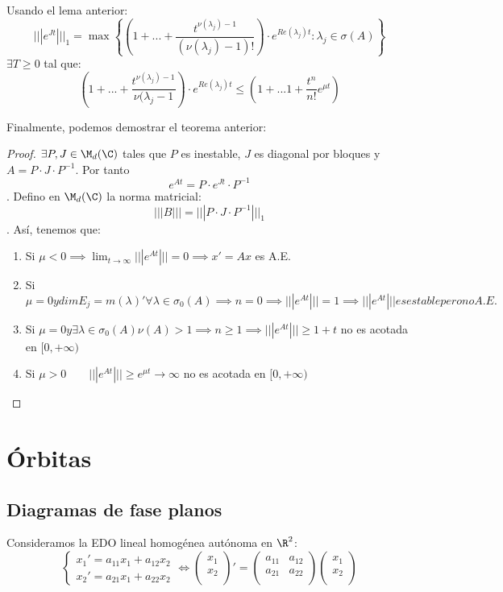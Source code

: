 Usando el lema anterior:
\begin{equation}
|||e^{Jt}|||_1=\max
\left\{ {\left(
1+...+\frac{t^{\nu(\lambda_j)-1}}{(\nu (\lambda_j)-1)!}
\right) }
\cdot e^{Re(\lambda_j)t} : \lambda_j \in \sigma(A) \right\}
\tag{cosarara}\label{cosarara}
\end{equation}
$\exists T \geq 0$ tal que:
\begin{equation}
(1+...+\frac{t^{\nu(\lambda_j)-1}}{\nu(\lambda_j - 1})\cdot e^{Re(\lambda_j)t} \leq (1+...1+\frac{t^n}{n!}e^{\mu t})
\end{equation}

Finalmente, podemos demostrar el teorema anterior:

\begin{proof}
$\exists P, J \in \M_d(\C)$ tales que $P$ es inestable, $J$ es diagonal por bloques y $A=P\cdot J \cdot P^{-1}$. Por tanto $$e^{At}=P\cdot e^{Jt} \cdot P^{-1}$$.
Defino en $\M_d(\C)$ la norma matricial:
$$|||B|||=|||P\cdot J \cdot P^{-1}|||_1$$.
Así, tenemos que:
\begin{enumerate}
\item Si $\mu < 0 \implies \lim_{t\to\infty}|||e^{At}|||=0\implies x'=Ax$ es A.E.
\item Si $\mu = 0 y dimE_j=m(\lambda)' \forall \lambda \in \sigma_0(A)\implies n=0 \implies |||e^{At}|||=1\implies|||e^{At}||| es estable pero no A.E.$
\item Si $\mu = 0 y \exists \lambda \in \sigma_0(A) \nu(A)>1 \implies n\geq 1\implies |||e^{At}|||\geq 1+t$ no es acotada en $[0,+\infty)$
\item Si $\mu > 0 \qquad |||e^{At}|||\geq e^{\mu t}\to \infty$ no es acotada en $[0,+\infty)$
\end{enumerate}
\end{proof}


\section{Órbitas}
\subsection{Diagramas de fase planos}
Consideramos la EDO lineal homogénea autónoma en $\R^2$:
\begin{equation}
\left\{\begin{array}{rl}
x_1'=a_{11}x_1+a_{12}x_2 \\
x_2'=a_{21}x_1+a_{22}x_2
\end{array}\right.\Leftrightarrow
\begin{pmatrix}
x_1 \\
x_2 \\
\end{pmatrix}
'=
\begin{pmatrix}
a_{11} & a_{12} \\
a_{21} & a_{22} \\
\end{pmatrix}
\begin{pmatrix}
x_1 \\
x_2 \\
\end{pmatrix}
\end{equation}

